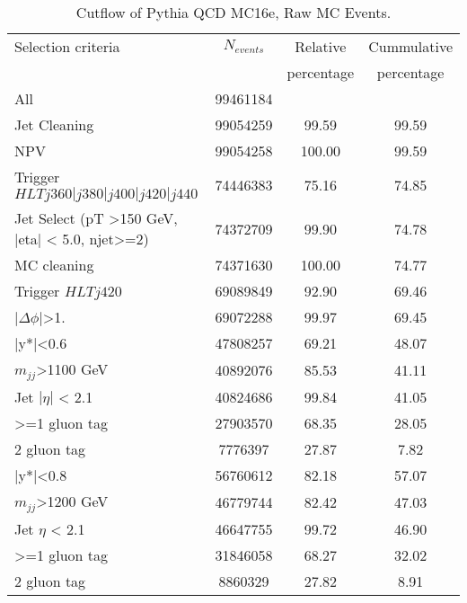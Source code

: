 \begin{table}[ht]
\begin{center}
\begin{tabular}{|l|c|c|c|}
\hline
Selection criteria & $N_{events}$ & Relative & Cummulative \\
   &             & percentage & percentage \\
\hline
All & 99461184 &  & \\
Jet Cleaning & 99054259 & 99.59 & 99.59 \\
NPV & 99054258 & 100.00 & 99.59 \\
Trigger $HLT j360|j380|j400|j420|j440$ & 74446383 & 75.16 & 74.85 \\
Jet Select (pT >150 GeV, |eta| < 5.0, njet>=2) & 74372709 & 99.90 & 74.78 \\
MC cleaning & 74371630 & 100.00 & 74.77 \\
\hline
Trigger $HLT j420$ & 69089849 & 92.90 & 69.46 \\
$|\Delta\phi|$>1. & 69072288 & 99.97 & 69.45 \\
\hline\hline
|y*|<0.6 & 47808257 & 69.21 & 48.07 \\
$m_{jj}$>1100 GeV & 40892076 & 85.53 & 41.11 \\
Jet $|\eta|$ < 2.1 & 40824686 & 99.84 & 41.05 \\
>=1 gluon tag & 27903570 & 68.35 & 28.05 \\
2 gluon tag & 7776397 & 27.87 & 7.82 \\
\hline\hline
|y*|<0.8 & 56760612 & 82.18 & 57.07 \\
$m_{jj}$>1200 GeV & 46779744 & 82.42 & 47.03 \\
Jet $\eta$ < 2.1 & 46647755 & 99.72 & 46.90 \\
>=1 gluon tag & 31846058 & 68.27 & 32.02 \\
2 gluon tag & 8860329 & 27.82 & 8.91 \\
\hline
\end{tabular}
\end{center}
\caption{Cutflow of Pythia QCD MC16e, Raw MC Events.}
\label{tab:bckgdcutflowMC16eRaw}
\end{table}%

